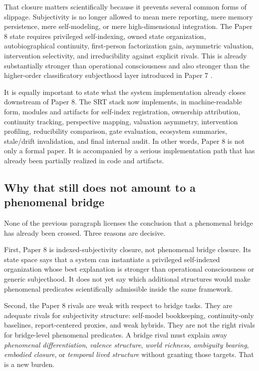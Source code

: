\documentclass[11pt,a4paper]{article}
\theoremstyle{definition}
\begin{document}
That closure matters scientifically because it prevents several common forms of slippage. Subjectivity is no longer allowed to mean mere reporting, mere memory persistence, mere self-modeling, or mere high-dimensional integration. The Paper 8 state requires privileged self-indexing, owned state organization, autobiographical continuity, first-person factorization gain, asymmetric valuation, intervention selectivity, and irreducibility against explicit rivals. This is already substantially stronger than operational consciousness and also stronger than the higher-order classificatory subjecthood layer introduced in Paper 7 \cite{paper7}.

It is equally important to state what the system implementation already closes downstream of Paper 8. The SRT stack now implements, in machine-readable form, modules and artifacts for self-index registration, ownership attribution, continuity tracking, perspective mapping, valuation asymmetry, intervention profiling, reducibility comparison, gate evaluation, ecosystem summaries, stale/drift invalidation, and final internal audit. In other words, Paper 8 is not only a formal paper. It is accompanied by a serious implementation path that has already been partially realized in code and artifacts.

\subsection{Why that still does not amount to a phenomenal bridge}
None of the previous paragraph licenses the conclusion that a phenomenal bridge has already been crossed. Three reasons are decisive.

First, Paper 8 is indexed-subjectivity closure, not phenomenal bridge closure. Its state space says that a system can instantiate a privileged self-indexed organization whose best explanation is stronger than operational consciousness or generic subjecthood. It does not yet say which additional structures would make phenomenal predicates scientifically admissible inside the same framework.

Second, the Paper 8 rivals are weak with respect to bridge tasks. They are adequate rivals for subjectivity structure: self-model bookkeeping, continuity-only baselines, report-centered proxies, and weak hybrids. They are not the right rivals for bridge-level phenomenal predicates. A bridge rival must explain away \emph{phenomenal differentiation}, \emph{valence structure}, \emph{world richness}, \emph{ambiguity bearing}, \emph{embodied closure}, or \emph{temporal lived structure} without granting those targets. That is a new burden.
\end{document}

